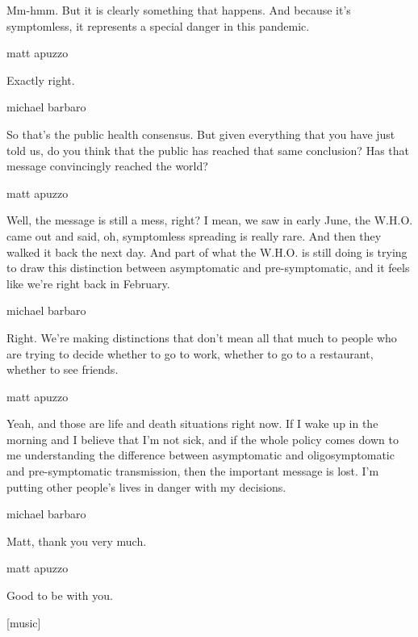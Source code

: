 Mm-hmm. But it is clearly something that happens. And because it's
symptomless, it represents a special danger in this pandemic.

matt apuzzo

Exactly right.

michael barbaro

So that's the public health consensus. But given everything that you
have just told us, do you think that the public has reached that same
conclusion? Has that message convincingly reached the world?

matt apuzzo

Well, the message is still a mess, right? I mean, we saw in early June,
the W.H.O. came out and said, oh, symptomless spreading is really rare.
And then they walked it back the next day. And part of what the W.H.O.
is still doing is trying to draw this distinction between asymptomatic
and pre-symptomatic, and it feels like we're right back in February.

michael barbaro

Right. We're making distinctions that don't mean all that much to people
who are trying to decide whether to go to work, whether to go to a
restaurant, whether to see friends.

matt apuzzo

Yeah, and those are life and death situations right now. If I wake up in
the morning and I believe that I'm not sick, and if the whole policy
comes down to me understanding the difference between asymptomatic and
oligosymptomatic and pre-symptomatic transmission, then the important
message is lost. I'm putting other people's lives in danger with my
decisions.

michael barbaro

Matt, thank you very much.

matt apuzzo

Good to be with you.

{[}music{]}

